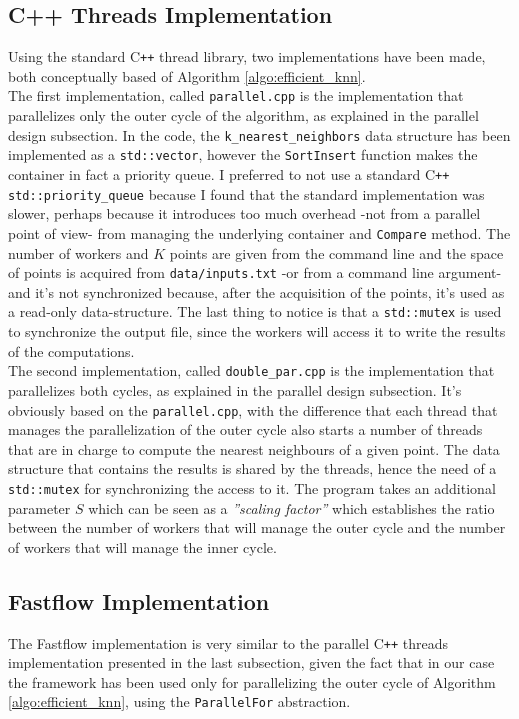 \documentclass[12pt, letterpaper]{article}  %
\begin{document}
\subsection{C++ Threads Implementation}
Using the standard C\verb!++! thread library, two implementations have been made, both conceptually based of Algorithm \ref{algo:efficient_knn}.\\
The first implementation, called \texttt{parallel.cpp} is the implementation that parallelizes only the outer cycle of the algorithm, as explained in the parallel design subsection. In the code, the \texttt{k\_nearest\_neighbors} data structure has been implemented as a \texttt{std::vector}, however the \texttt{SortInsert} function makes the container in fact a priority queue. I preferred to not use a standard C\verb!++! \texttt{std::priority\_queue} because I found that the standard implementation was slower, perhaps because it introduces too much overhead -not from a parallel point of view- from managing the underlying container and \texttt{Compare} method. The number of workers and $K$ points are given from the command line and the space of points is acquired from \texttt{data/inputs.txt} -or from a command line argument- and it's not synchronized because, after the acquisition of the points, it's used as a read-only data-structure. The last thing to notice is that a \texttt{std::mutex} is used to synchronize the output file, since the workers will access it to write the results of the computations.\\
The second implementation, called \texttt{double\_par.cpp} is the implementation that parallelizes both cycles, as explained in the parallel design subsection. It's obviously based on the \texttt{parallel.cpp}, with the difference that each thread that manages the parallelization of the outer cycle also starts a number of threads that are in charge to compute the nearest neighbours of a given point. The data structure that contains the results is shared by the threads, hence the need of a \texttt{std::mutex} for synchronizing the access to it. The program takes an additional parameter $S$ which can be seen as a \textit{''scaling factor''} which establishes the ratio between the number of workers that will manage the outer cycle and the number of workers that will manage the inner cycle.

\subsection{Fastflow Implementation}
The Fastflow implementation is very similar to the parallel C\verb!++! threads implementation presented in the last subsection, given the fact that in our case the framework has been used only for parallelizing the outer cycle of Algorithm \ref{algo:efficient_knn}, using the \texttt{ParallelFor} abstraction.
\end{document}

